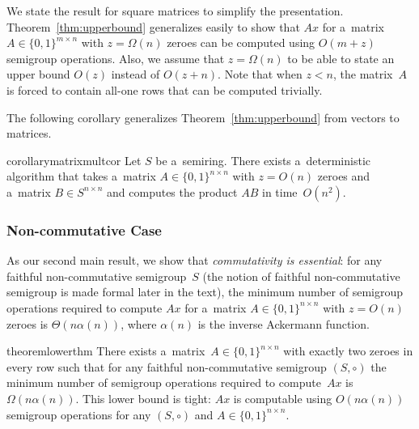 \documentclass{toc}
\begin{document}
We state the result for square matrices to simplify the presentation.
Theorem~\ref{thm:upperbound} generalizes easily to show that $Ax$ for a~matrix
$A \in \{0,1\}^{m \times n}$ with $z=\Omega(n)$ zeroes can be computed using
$O(m+z)$ semigroup operations. Also, we assume that $z=\Omega(n)$ to be able to
state an upper bound $O(z)$ instead of $O(z+n)$. Note that when $z<n$, the
matrix~$A$ is forced to contain all-one rows that can be computed trivially.

The following corollary generalizes Theorem~\ref{thm:upperbound}
from vectors to matrices.

\begin{restatable}{corollary}{matrixmultcor}
\label{cor:matrixmultiplication}
Let $S$ be a~semiring. There exists a~deterministic algorithm that takes a~matrix
\linebreak${A \in \{0,1\}^{n \times n}}$ with $z=O(n)$ zeroes and a~matrix
$B \in S^{n \times n}$ and computes the product $AB$ in time~$O(n^2)$.
\end{restatable}

\subsubsection{Non-commutative Case}


As our second main result, we show that \emph{commutativity is essential}: for
any faithful non-commutative semigroup~$S$
(the notion of faithful non-commutative semigroup  is made formal
later in the text), the minimum number of semigroup operations
required to compute $Ax$ for a~matrix
$A \in \{0,1\}^{n \times n}$ with $z=O(n)$ zeroes is
$\Theta(n\alpha(n))$, where $\alpha(n)$ is the inverse Ackermann function.

\begin{restatable}{theorem}{lowerthm}
\label{thm:lowerbound}
There exists
a~matrix~$A \in \{0,1\}^{n \times n}$ with exactly two zeroes
in every row such that for any faithful non-commutative semigroup $(S, \circ)$
the minimum number of semigroup operations required to compute~$Ax$ is
$\Omega(n\alpha(n))$.
This lower bound is tight: $Ax$ is	computable using $O(n\alpha(n))$ semigroup operations for any $(S, \circ)$ and $A\in \{0,1\}^{n \times n}$.
\end{restatable}
\end{document}
